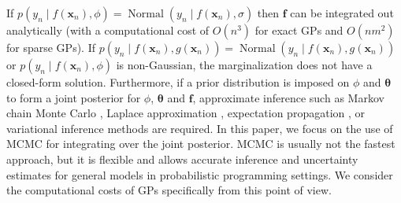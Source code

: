 \documentclass[onecolumn,a4paper,11pt]{article}
\DeclareMathOperator{\Normal}{Normal}
\begin{document}

 

If $p(y_n \mid f(\bm{x}_n),\phi)=\Normal(y_n \mid f(\bm{x}_n),\sigma)$ then $\bm{f}$ can be integrated out analytically (with a computational cost of $O(n^3)$ for exact GPs and $O(nm^2)$ for sparse GPs). If $p(y_n \mid f(\bm{x}_n),g(\bm{x}_n))=\Normal(y_n \mid f(\bm{x}_n),g(\bm{x}_n))$ or $p(y_n \mid f(\bm{x}_n),\phi)$ is non-Gaussian, the marginalization does not have a closed-form solution. Furthermore, if a prior distribution is imposed on $\phi$ and $\bm{\theta}$ to form a joint posterior for $\phi$, $\bm{\theta}$ and $\bm{f}$, approximate inference such as Markov chain Monte Carlo \citep[MCMC; ][]{brooks_2011}, Laplace approximation \citep{williams1998bayesian,rasmussen2006gaussian}, expectation propagation \citep{minka2001expectation}, or variational inference methods \citep{gibbs2000variational,csato2000efficient} are required. In this paper, we focus on the use of MCMC for integrating over the joint posterior. MCMC is usually not the fastest approach, but it is flexible and allows accurate inference and uncertainty estimates for general models in probabilistic programming settings. We consider the computational costs of GPs specifically from this point of view.
\end{document}
